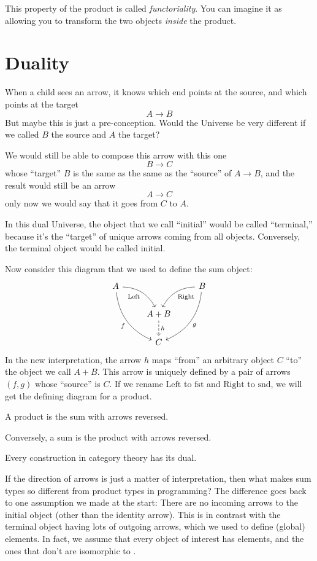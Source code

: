\documentclass[DaoFP]{subfiles}
\begin{document}
This property of the product is called \emph{functoriality}. You can imagine it as allowing you to transform the two objects \emph{inside} the product. 

\section{Duality}

When a child sees an arrow, it knows which end points at the source, and which points at the target
\[A \to B \]
But maybe this is just a pre-conception. Would the Universe be very different if we called $B$ the source and $A$ the target? 

We would still be able to compose this arrow with this one
\[B \to C\]
whose ``target'' $B$ is the same as the same as the ``source'' of $A \to B$, and the result would still be an arrow 
\[A \to C\]
 only now we would say that it goes from $C$ to $A$.

In this dual Universe, the object that we call ``initial'' would be called ``terminal,'' because it's the ``target'' of unique arrows coming from all objects. Conversely, the terminal object would be called initial.

Now consider this diagram that we used to define the sum object:
\[
 \begin{tikzcd}
 A
 \arrow[dr,  bend left, "\text{Left}"']
 \arrow[ddr, bend right, "f"']
 && B
 \arrow[dl, bend right, "\text{Right}"]
 \arrow[ddl, bend left, "g"]
 \\
&A + B
\arrow[d, dashed, "h"]
\\
& C
 \end{tikzcd}
\]
In the new interpretation, the arrow $h$ maps ``from'' an arbitrary object $C$ ``to'' the object we call $A + B$. This arrow is uniquely defined by a pair of arrows $(f, g)$ whose ``source'' is $C$. If we rename $\text{Left}$ to $\text{fst}$ and $\text{Right}$ to $\text{snd}$, we will get  the defining diagram for a product. 

A product is the sum with arrows reversed. 

Conversely, a sum is the product with arrows reversed. 

\medskip

Every construction in category theory has its dual.

\medskip

If the direction of arrows is just a matter of interpretation, then what makes sum types so different from product types in programming? The difference goes back to one assumption we made at the start: There are no incoming arrows to the initial object (other than the identity arrow). This is in contrast with the terminal object having lots of outgoing arrows, which we used to define (global) elements. In fact, we assume that every object of interest has elements, and the ones that don't are isomorphic to . 
\end{document}
